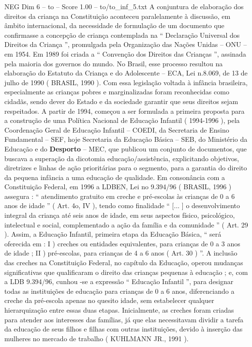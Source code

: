\begin{textsample}{NEG Dim 6 – to – Score 1.00 – to/to\_inf\_5.txt}
A conjuntura de elaboração dos direitos da criança na Constituição aconteceu paralelamente à discussão, em âmbito internacional, da necessidade de formulação de um documento que confirmasse a concepção de criança contemplada na “ Declaração Universal dos Direitos da Criança ”, promulgada pela Organização das Nações Unidas – ONU – em 1954.
Em 1989 foi criada a “ Convenção dos Direitos das Crianças ”, assinada pela maioria dos governos do mundo.
No Brasil, esse processo resultou na elaboração do Estatuto da Criança e do Adolescente – ECA, Lei n.8.069, de 13 de julho de 1990 ( BRASIL, 1990 ).
Com essa legislação voltada à infância brasileira, especialmente as crianças pobres e marginalizadas foram reconhecidas como cidadãs, sendo dever do Estado e da sociedade garantir que seus direitos sejam respeitados.
A partir de 1994, começou a ser formulada a primeira proposta para a construção de uma Política Nacional de Educação Infantil ( 1994-1996 ), pela Coordenação Geral de Educação Infantil – COEDI, da Secretaria de Ensino Fundamental – SEF, hoje Secretaria da Educação Básica – SEB, do Ministério da Educação e do \textbf{Desporto} – MEC, que publicou um conjunto de documentos, que buscava a superação da dicotomia educação/assistência, explicitando objetivos, diretrizes e linhas de ação prioritárias para o segmento, para a garantia do direito da pequena infância a uma educação de qualidade.
Em consonância com a Constituição Federal, em 1996 a LDBEN, Lei no 9.394/96 ( BRASIL, 1996 ) assegura : “ atendimento gratuito em creche e pré-escolas às crianças de 0 a 6 anos de idade ” ( Art. 4o, IV ), tendo como finalidade “ [... ] o desenvolvimento integral da criança até seis anos de idade, em seus aspectos físico, psicológico, intelectual e social, complementado a ação da família e da comunidade ” ( Art. 29 ).
Assim, a Educação Infantil, primeira etapa da Educação Básica, “ será oferecida em : I ) creches ou entidades equivalentes, para crianças de 0 a 3 anos de idade ; II ) pré-escolas, para crianças de 4 a 6 anos ( Art. 30 ) ”.
A inclusão das creches na Constituição Federal, no capítulo da Educação, operou mudanças significativas que qualificaram o direito das crianças pequenas à educação ; e, com a LDB 9.394/96, cunhou -se a expressão “ Educação Infantil ”, para designar todas as instituições de educação para crianças de 0 a 6 anos, diferenciando a creche da pré-escola apenas no quesito idade, sem estabelecer qualquer hierarquização entre essas duas etapas.
Inicialmente, as creches foram criadas para atender aos interesses das famílias, já que elas necessitavam dividir a tarefa da educação de seus filhos e filhas com outras instituições, devido à inserção das mulheres no mercado de trabalho ( KUHLMANN JR., 1991 ).

\end{textsample}
